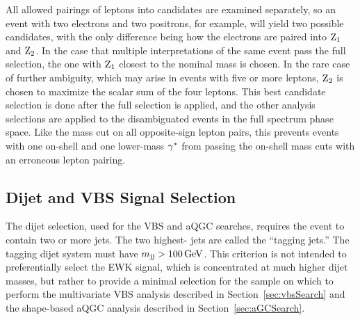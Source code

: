 All allowed pairings of leptons into {\Zgs} candidates are examined separately, so an event with two electrons and two positrons, for example, will yield two possible {\ZZ} candidates, with the only difference being how the electrons are paired into $\mathrm{Z}_1$ and $\mathrm{Z}_2$.
In the case that multiple interpretations of the same event pass the full selection, the one with $\mathrm{Z}_1$ closest to the nominal {\PZ} mass is chosen.
In the rare case of further ambiguity, which may arise in events with five or more leptons, $\mathrm{Z}_2$ is chosen to maximize the scalar {\pt} sum of the four leptons.
This best candidate selection is done after the full selection is applied, and the other analysis selections are applied to the disambiguated events in the full spectrum phase space.
Like the mass cut on all opposite-sign lepton pairs, this prevents events with one on-shell {\PZ} and one lower-mass $\mathrm{\gamma}^\ast$ from passing the on-shell {\PZ} mass cuts with an erroneous lepton pairing.


\subsection{Dijet and VBS Signal Selection}\label{sec:vbsSelection}

The dijet selection, used for the VBS and aQGC searches, requires the event to contain two or more jets.
The two highest-{\pt} jets are called the ``tagging jets.''
The tagging dijet system must have $m_{\mathrm{j}\mathrm{j}} > 100\,\mathrm{Ge\hspace{-.08em}V}$.
This criterion is not intended to preferentially select the EWK signal, which is concentrated at much higher dijet masses, but rather to provide a minimal selection for the sample on which to perform the multivariate VBS analysis described in Section~\ref{sec:vbsSearch} and the shape-based aQGC analysis described in Section~\ref{sec:aGCSearch}.
